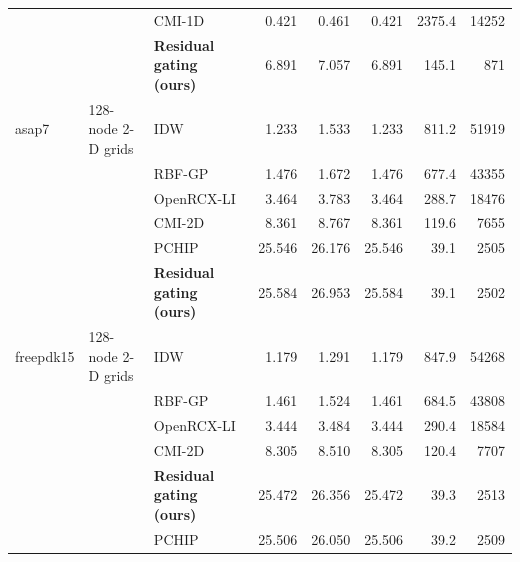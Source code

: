 \begin{tabular}{lllrrrrr}
 &  & CMI-1D & 0.421 & 0.461 & 0.421 & 2375.4 & 14252 \\
 &  & \textbf{Residual gating (ours)} & 6.891 & 7.057 & 6.891 & 145.1 & 871 \\
\midrule
asap7 & 128-node 2-D grids & IDW & 1.233 & 1.533 & 1.233 & 811.2 & 51919 \\
 &  & RBF-GP & 1.476 & 1.672 & 1.476 & 677.4 & 43355 \\
 &  & OpenRCX-LI & 3.464 & 3.783 & 3.464 & 288.7 & 18476 \\
 &  & CMI-2D & 8.361 & 8.767 & 8.361 & 119.6 & 7655 \\
 &  & PCHIP & 25.546 & 26.176 & 25.546 & 39.1 & 2505 \\
 &  & \textbf{Residual gating (ours)} & 25.584 & 26.953 & 25.584 & 39.1 & 2502 \\
\midrule
freepdk15 & 128-node 2-D grids & IDW & 1.179 & 1.291 & 1.179 & 847.9 & 54268 \\
 &  & RBF-GP & 1.461 & 1.524 & 1.461 & 684.5 & 43808 \\
 &  & OpenRCX-LI & 3.444 & 3.484 & 3.444 & 290.4 & 18584 \\
 &  & CMI-2D & 8.305 & 8.510 & 8.305 & 120.4 & 7707 \\
 &  & \textbf{Residual gating (ours)} & 25.472 & 26.356 & 25.472 & 39.3 & 2513 \\
 &  & PCHIP & 25.506 & 26.050 & 25.506 & 39.2 & 2509 \\
\bottomrule\end{tabular}
